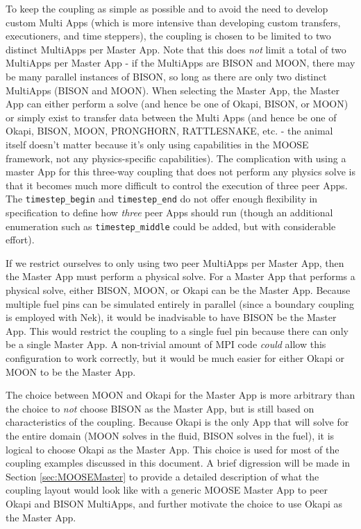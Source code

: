 \documentclass[10pt]{article}
\numberwithin{equation}{section} %
\begin{document}
To keep the coupling as simple as possible and to avoid the need to develop custom Multi Apps (which is more intensive than developing custom transfers, executioners, and time steppers), the coupling is chosen to be limited to two distinct MultiApps per Master App. Note that this does {\it not} limit a total of two MultiApps per Master App - if the MultiApps are BISON and MOON, there may be many parallel instances of BISON, so long as there are only two distinct MultiApps (BISON and MOON). When selecting the Master App, the Master App can either perform a solve (and hence be one of Okapi, BISON, or MOON) or simply exist to transfer data between the Multi Apps (and hence be one of Okapi, BISON, MOON, PRONGHORN, RATTLESNAKE, etc. - the animal itself doesn't matter because it's only using capabilities in the MOOSE framework, not any physics-specific capabilities). The complication with using a master App for this three-way coupling that does not perform any physics solve is that it becomes much more difficult to control the execution of three peer Apps. The {\tt timestep\_begin} and {\tt timestep\_end} do not offer enough flexibility in specification to define how {\it three} peer Apps should run (though an additional enumeration such as {\tt timestep\_middle} could be added, but with considerable effort).

If we restrict ourselves to only using two peer MultiApps per Master App, then the Master App must perform a physical solve. For a Master App that performs a physical solve, either BISON, MOON, or Okapi can be the Master App. Because multiple fuel pins can be simulated entirely in parallel (since a boundary coupling is employed with Nek), it would be inadvisable to have BISON be the Master App. This would restrict the coupling to a single fuel pin because there can only be a single Master App. A non-trivial amount of MPI code {\it could} allow this configuration to work correctly, but it would be much easier for either Okapi or MOON to be the Master App. 

The choice between MOON and Okapi for the Master App is more arbitrary than the choice to {\it not} choose BISON as the Master App, but is still based on characteristics of the coupling. Because Okapi is the only App that will solve for the entire domain (MOON solves in the fluid, BISON solves in the fuel), it is logical to choose Okapi as the Master App. This choice is used for most of the coupling examples discussed in this document. A brief digression will be made in Section \ref{sec:MOOSEMaster} to provide a detailed description of what the coupling layout would look like with a generic MOOSE Master App to peer Okapi and BISON MultiApps, and further motivate the choice to use Okapi as the Master App.
\end{document}
